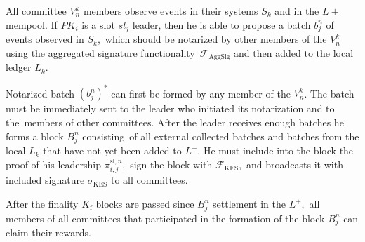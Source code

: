 \begin{legal}
    \item All committee $V^k_n$ members observe events in their systems $S_k$ and in the $L+$ mempool.
    If $PK_i$ is a slot $sl_j$ leader, then he is able to propose a batch $b^n_j$ of events observed in $S_k$,\
    which should be notarized by other members of the $V^k_n$ using the aggregated signature functionality\
    ${\mathcal{F}}_{\text{AggSig}}$ and then added to the local ledger $L_k$.

    \item Notarized batch $(b^n_j)^*$ can first be formed by any member of the $V^k_n$.
    The batch must be immediately sent to the leader who initiated its notarization and to the\
    members of other committees.
    After the leader receives enough batches he forms a block  $B^n_j$ consisting\
    of all external collected batches and batches from the local $L_k$ that have not yet been added to $L^+$.
    He must include into the block the proof of his leadership $ \pi_{i, j}^{\text{sl}, n}$,\
    sign the block with ${\mathcal{F}}_{\text{KES}}$,\
    and broadcasts it with included signature $\sigma_{\text{KES}}$ to all committees.

    \item After the finality $K_{\text{f}}$ blocks are passed since $B^n_j$ settlement in the $L^+$,\
    all members of all committees that participated in the formation of the block $B^n_j$ can claim their rewards.

\end{legal}

